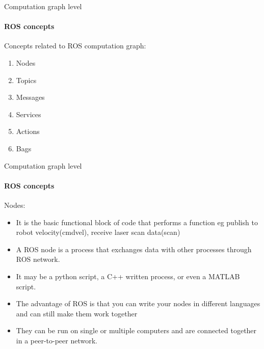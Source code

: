 \documentclass{beamer}
\begin{document}
\begin{frame}{Computation graph level}
    \framesubtitle{ROS concepts}
    
    Concepts related to ROS computation graph:
    
    \begin{enumerate}
        \item Nodes
        \item Topics
        \item Messages
        \item Services
        \item Actions
        \item Bags
    \end{enumerate}
\end{frame}

\begin{frame}{Computation graph level}
    \framesubtitle{ROS concepts}
    {\huge Nodes:}
    \begin{itemize}
        \item It is the basic functional block of code that performs a function eg publish to robot velocity(cmdvel), receive laser scan data(scan)
        \item A ROS node is a process that exchanges data with other processes through ROS network.
        \item It may be a python script, a C++ written process, or even a MATLAB script.
        \item The advantage of ROS is that you can write your nodes in different languages and can still make them work together 
       \item They can be run on single or multiple computers and are connected together in a peer-to-peer network.
    \end{itemize}
\end{frame}
\end{document}
